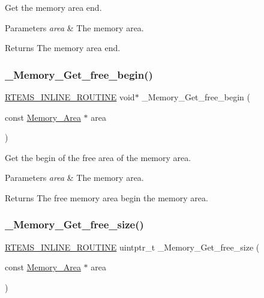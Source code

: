 Get the memory area end. 


\begin{DoxyParams}{Parameters}
{\em area} & The memory area.\\
\hline
\end{DoxyParams}
\begin{DoxyReturn}{Returns}
The memory area end. 
\end{DoxyReturn}
\mbox{\label{group__RTEMSScoreMemory_ga75120e2d8e6de6e70c9e910d933828e5}} 
\subsubsection{\texorpdfstring{\_Memory\_Get\_free\_begin()}{\_Memory\_Get\_free\_begin()}}
{\footnotesize\ttfamily \mbox{\hyperlink{group__RTEMSScoreBaseDefs_gac216239df231d5dbd15e3520b0b9313f}{R\+T\+E\+M\+S\+\_\+\+I\+N\+L\+I\+N\+E\+\_\+\+R\+O\+U\+T\+I\+NE}} void$\ast$ \+\_\+\+Memory\+\_\+\+Get\+\_\+free\+\_\+begin (\begin{DoxyParamCaption}\item[{const \mbox{\hyperlink{structMemory__Area}{Memory\+\_\+\+Area}} $\ast$}]{area }\end{DoxyParamCaption})}



Get the begin of the free area of the memory area. 


\begin{DoxyParams}{Parameters}
{\em area} & The memory area.\\
\hline
\end{DoxyParams}
\begin{DoxyReturn}{Returns}
The free memory area begin the memory area. 
\end{DoxyReturn}
\mbox{\label{group__RTEMSScoreMemory_ga587b6b432ef9f07573042c0dc76cfe48}} 
\subsubsection{\texorpdfstring{\_Memory\_Get\_free\_size()}{\_Memory\_Get\_free\_size()}}
{\footnotesize\ttfamily \mbox{\hyperlink{group__RTEMSScoreBaseDefs_gac216239df231d5dbd15e3520b0b9313f}{R\+T\+E\+M\+S\+\_\+\+I\+N\+L\+I\+N\+E\+\_\+\+R\+O\+U\+T\+I\+NE}} uintptr\+\_\+t \+\_\+\+Memory\+\_\+\+Get\+\_\+free\+\_\+size (\begin{DoxyParamCaption}\item[{const \mbox{\hyperlink{structMemory__Area}{Memory\+\_\+\+Area}} $\ast$}]{area }\end{DoxyParamCaption})}



